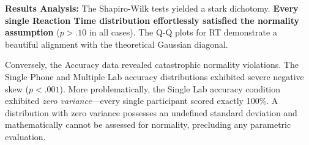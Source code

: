 \documentclass[11pt,a4paper]{article}
\begin{document}
\begin{table}[htbp]
\centering
\caption{Comprehensive Shapiro--Wilk normality test results.}
\label{tab:normality}
\small
{}
\end{table}

\textbf{Results Analysis:}
The Shapiro-Wilk tests yielded a stark dichotomy. \textbf{Every single Reaction Time distribution effortlessly satisfied the normality assumption} ($p > .10$ in all cases). The Q-Q plots for RT demonstrate a beautiful alignment with the theoretical Gaussian diagonal.

Conversely, the Accuracy data revealed catastrophic normality violations. The Single Phone and Multiple Lab accuracy distributions exhibited severe negative skew ($p < .001$). More problematically, the Single Lab accuracy condition exhibited \textit{zero variance}—every single participant scored exactly 100\%. A distribution with zero variance possesses an undefined standard deviation and mathematically cannot be assessed for normality, precluding any parametric evaluation.
\end{document}
